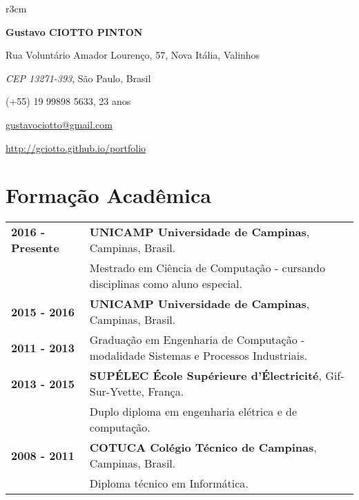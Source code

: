 \documentclass[10pt, a4paper]{article}
\author{Gustavo Ciotto Pinton}
\begin{document}
\pagestyle{empty}

\begin{wrapfigure}{r}{3cm}
\vspace{-20pt}
\begin{center}
\end{center}
\end{wrapfigure}

\textbf{\LARGE Gustavo CIOTTO PINTON}

Rua Voluntário Amador Lourenço, 57, Nova Itália, Valinhos

\textit{CEP 13271-393}, São Paulo, Brasil

(+55) 19 99898 5633, 23 anos

\url{gustavociotto@gmail.com}

\url{http://gciotto.github.io/portfolio}

\vspace{8pt}




\section{Formação Acadêmica}

\begin{tabular}{p{} p{}}

\textbf{2016 - Presente} & \textbf{UNICAMP Universidade de Campinas}, Campinas,
Brasil.
\\
& Mestrado em Ciência de Computação - cursando disciplinas como aluno especial.
\vspace{8pt}\\

\textbf{2015 - 2016} & \textbf{UNICAMP Universidade de Campinas}, Campinas,
Brasil.
\\
\textbf{2011 - 2013} & Graduação em Engenharia de Computação - modalidade
Sistemas e Processos Industriais. \vspace{8pt}\\

\textbf{2013 - 2015} & \textbf{SUPÉLEC  École Supérieure d'Électricité},
Gif-Sur-Yvette, França. \\
& Duplo diploma em  engenharia elétrica e de computação. \vspace{8pt} \\

\textbf{2008 - 2011} & \textbf{COTUCA Colégio Técnico de Campinas}, Campinas,
Brasil. \\
& Diploma técnico em Informática. \\
\end{tabular}
\end{document}
